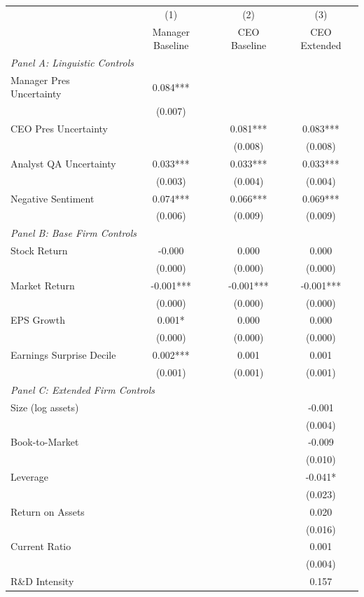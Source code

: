 \begin{table}[htbp]
\begin{tabular}{@{}lccc@{}}
\toprule
& (1) & (2) & (3) \\
& Manager Baseline & CEO Baseline & CEO Extended \\
\midrule
\multicolumn{4}{l}{\textit{Panel A: Linguistic Controls}} \\
\midrule
Manager Pres Uncertainty & 0.084*** & & \\
& (0.007) & & \\[0.5em]
CEO Pres Uncertainty & & 0.081*** & 0.083*** \\
& & (0.008) & (0.008) \\[0.5em]
Analyst QA Uncertainty & 0.033*** & 0.033*** & 0.033*** \\
& (0.003) & (0.004) & (0.004) \\[0.5em]
Negative Sentiment & 0.074*** & 0.066*** & 0.069*** \\
& (0.006) & (0.009) & (0.009) \\
\midrule
\multicolumn{4}{l}{\textit{Panel B: Base Firm Controls}} \\
\midrule
Stock Return & -0.000 & 0.000 & 0.000 \\
& (0.000) & (0.000) & (0.000) \\[0.5em]
Market Return & -0.001*** & -0.001*** & -0.001*** \\
& (0.000) & (0.000) & (0.000) \\[0.5em]
EPS Growth & 0.001* & 0.000 & 0.000 \\
& (0.000) & (0.000) & (0.000) \\[0.5em]
Earnings Surprise Decile & 0.002*** & 0.001 & 0.001 \\
& (0.001) & (0.001) & (0.001) \\
\midrule
\multicolumn{4}{l}{\textit{Panel C: Extended Firm Controls}} \\
\midrule
Size (log assets) & & & -0.001 \\
& & & (0.004) \\[0.5em]
Book-to-Market & & & -0.009 \\
& & & (0.010) \\[0.5em]
Leverage & & & -0.041* \\
& & & (0.023) \\[0.5em]
Return on Assets & & & 0.020 \\
& & & (0.016) \\[0.5em]
Current Ratio & & & 0.001 \\
& & & (0.004) \\[0.5em]
R\&D Intensity & & & 0.157 \\

\end{tabular}
\end{table}
